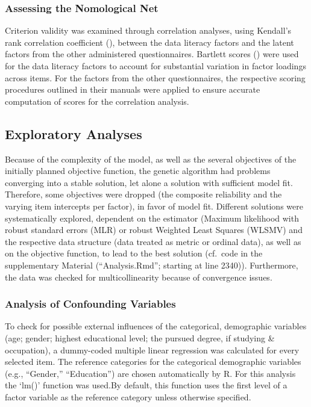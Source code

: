\documentclass[
  12pt,
  a4paper,
  twoside]{article}
\begin{document}
\subsubsection{Assessing the Nomological Net}\label{assessing-the-nomological-net}

Criterion validity was examined through correlation analyses, using Kendall's rank correlation coefficient (), between the data literacy factors and the latent factors from the other administered questionnaires. Bartlett scores () were used for the data literacy factors to account for substantial variation in factor loadings across items. For the factors from the other questionnaires, the respective scoring procedures outlined in their manuals were applied to ensure accurate computation of scores for the correlation analysis.

\subsection{Exploratory Analyses}\label{exploratory-analyses}

Because of the complexity of the model, as well as the several objectives of the initially planned objective function, the genetic algorithm had problems converging into a stable solution, let alone a solution with sufficient model fit. Therefore, some objectives were dropped (the composite reliability and the varying item intercepts per factor), in favor of model fit. Different solutions were systematically explored, dependent on the estimator (Maximum likelihood with robust standard errors (MLR) or robust Weighted Least Squares (WLSMV) and the respective data structure (data treated as metric or ordinal data), as well as on the objective function, to lead to the best solution (cf.~code in the supplementary Material (``Analysis.Rmd''; starting at line 2340)). Furthermore, the data was checked for multicollinearity because of convergence issues.

\subsubsection{Analysis of Confounding Variables}\label{analysis-of-confounding-variables}

To check for possible external influences of the categorical, demographic variables (age; gender; highest educational level; the pursued degree, if studying \& occupation), a dummy-coded multiple linear regression was calculated for every selected item. The reference categories for the categorical demographic variables (e.g., ``Gender,'' ``Education'') are chosen automatically by R. For this analysis the `lm()' function was used.By default, this function uses the first level of a factor variable as the reference category unless otherwise specified.
\end{document}
